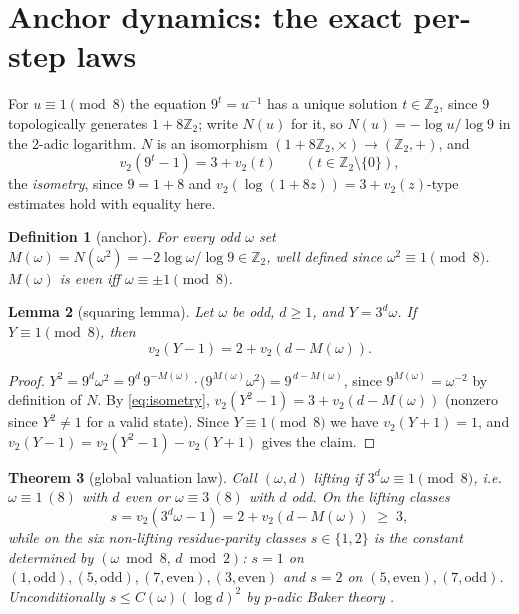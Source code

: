 \documentclass[11pt]{article}
\newtheorem{theorem}{Theorem}[section]
\newtheorem{lemma}[theorem]{Lemma}
\newtheorem{definition}[theorem]{Definition}
\theoremstyle{remark}
\newcommand{\Z}{\mathbb{Z}}
\newcommand{\vt}[1]{v_2\!\left(#1\right)}
\newcommand{\w}{\omega}
\begin{document}
\section{Anchor dynamics: the exact per-step laws}\label{sec:anchor}

For $u \equiv 1 \pmod 8$ the equation $9^{t} = u^{-1}$ has a unique solution $t \in \Z_2$, since $9$ topologically generates $1 + 8\Z_2$; write $N(u)$ for it, so $N(u) = -\log u/\log 9$ in the $2$-adic logarithm. $N$ is an isomorphism $(1+8\Z_2,\times)\to(\Z_2,+)$, and
\begin{equation}\label{eq:isometry}
\vt{9^t - 1} = 3 + \vt{t}\qquad (t \in \Z_2\setminus\{0\}),
\end{equation}
the \emph{isometry}, since $9 = 1 + 8$ and $\vt{\log(1+8z)} = 3 + \vt{z}$-type estimates hold with equality here.

\begin{definition}[anchor]
For every odd $\w$ set $M(\w) = N(\w^2) = -2\log\w/\log 9 \in \Z_2$, well defined since $\w^2\equiv 1 \pmod 8$. $M(\w)$ is even iff $\w\equiv\pm1\pmod 8$.
\end{definition}

\begin{lemma}[squaring lemma]\label{lem:squaring}
Let $\w$ be odd, $d \ge 1$, and $Y = 3^d\w$. If $Y \equiv 1 \pmod 8$, then
\[ \vt{Y - 1} = 2 + \vt{d - M(\w)}. \]
\end{lemma}

\begin{proof}
$Y^2 = 9^d\w^2 = 9^{d}\,9^{-M(\w)}\cdot\bigl(9^{M(\w)}\w^2\bigr) = 9^{\,d - M(\w)}$, since $9^{M(\w)} = \w^{-2}$ by definition of $N$. By \eqref{eq:isometry}, $\vt{Y^2 - 1} = 3 + \vt{d - M(\w)}$ (nonzero since $Y^2 \neq 1$ for a valid state). Since $Y \equiv 1 \pmod 8$ we have $\vt{Y+1} = 1$, and $\vt{Y-1} = \vt{Y^2-1} - \vt{Y+1}$ gives the claim.
\end{proof}

\begin{theorem}[global valuation law]\label{thm:vlaw}
Call $(\w,d)$ \emph{lifting} if $3^d\w \equiv 1 \pmod 8$, i.e.\ $\w\equiv1\ (8)$ with $d$ even or $\w\equiv3\ (8)$ with $d$ odd. On the lifting classes
\[ s = \vt{3^d\w - 1} = 2 + \vt{d - M(\w)} \;\ge\; 3, \]
while on the six non-lifting residue-parity classes $s \in \{1,2\}$ is the constant determined by $(\w \bmod 8,\, d \bmod 2)$: $s = 1$ on $(1,\mathrm{odd}), (5,\mathrm{odd}), (7,\mathrm{even}), (3,\mathrm{even})$ and $s = 2$ on $(5,\mathrm{even}), (7,\mathrm{odd})$. Unconditionally $s \le C(\w)(\log d)^2$ by $p$-adic Baker theory \cite{yu,bl}.
\end{theorem}
\end{document}
